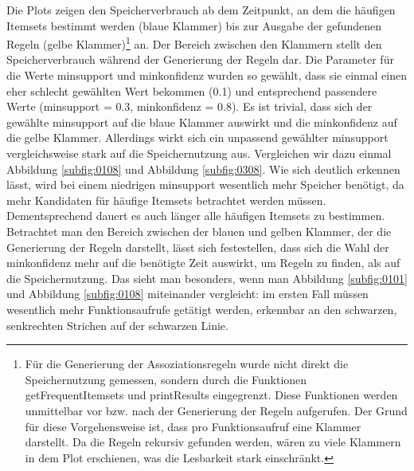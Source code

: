 Die Plots zeigen den Speicherverbrauch ab dem Zeitpunkt, an dem die häufigen Itemsets bestimmt werden (blaue Klammer) bis zur Ausgabe der gefundenen Regeln (gelbe Klammer)\footnote{Für die Generierung der Assoziationsregeln wurde nicht direkt die Speichernutzung gemessen, sondern durch die Funktionen getFrequentItemsets und printResults eingegrenzt. Diese Funktionen werden unmittelbar vor bzw. nach der Generierung der Regeln aufgerufen. Der Grund für diese Vorgehensweise ist, dass  pro Funktionsaufruf eine Klammer darstellt. Da die Regeln rekursiv gefunden werden, wären zu viele Klammern in dem Plot erschienen, was die Lesbarkeit stark einschränkt.} an. Der Bereich zwischen den Klammern stellt den Speicherverbrauch während der Generierung der Regeln dar. Die Parameter für die Werte minsupport und minkonfidenz wurden so gewählt, dass sie einmal einen eher schlecht gewählten Wert bekommen (0.1) und entsprechend passendere Werte (minsupport = 0.3, minkonfidenz = 0.8). Es ist trivial, dass sich der gewählte minsupport auf die blaue Klammer auswirkt und die minkonfidenz auf die gelbe Klammer. Allerdings wirkt sich ein unpassend gewählter minsupport vergleichsweise stark auf die Speichernutzung aus. Vergleichen wir dazu einmal Abbildung \ref{subfig:0108} und Abbildung \ref{subfig:0308}. Wie sich deutlich erkennen lässt, wird bei einem niedrigen minsupport wesentlich mehr Speicher benötigt, da mehr Kandidaten für häufige Itemsets betrachtet werden müssen. Dementsprechend dauert es auch länger alle häufigen Itemsets zu bestimmen. Betrachtet man den Bereich zwischen der blauen und gelben Klammer, der die Generierung der Regeln darstellt, lässt sich festestellen, dass sich die Wahl der minkonfidenz mehr auf die benötigte Zeit auswirkt, um Regeln zu finden, als auf die Speichernutzung. Das sieht man besonders, wenn man Abbildung \ref{subfig:0101} und Abbildung \ref{subfig:0108} miteinander vergleicht: im ersten Fall müssen wesentlich mehr Funktionsaufrufe getätigt werden, erkennbar an den schwarzen, senkrechten Strichen auf der schwarzen Linie.

